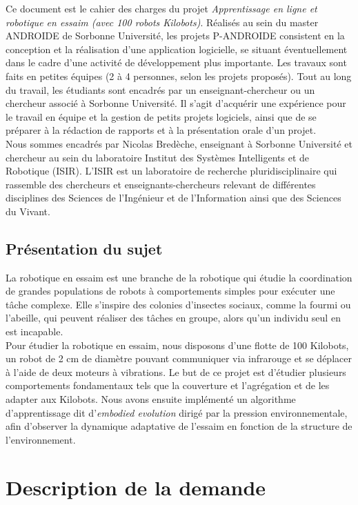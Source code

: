 \documentclass[a4paper]{article}
\begin{document}
Ce document est le cahier des charges du projet \textit{Apprentissage en ligne et robotique en essaim (avec 100 robots Kilobots)}.
Réalisés au sein du master ANDROIDE de Sorbonne Université, les projets P-ANDROIDE consistent en la conception et la réalisation d'une application logicielle, se situant éventuellement dans le cadre d'une activité de développement plus importante. Les travaux sont faits en petites équipes (2 à 4 personnes, selon les projets proposés). Tout au long du travail, les étudiants sont encadrés par un enseignant-chercheur ou un chercheur associé à Sorbonne Université. Il s’agit d'acquérir une expérience pour le travail en équipe et la gestion de petits projets logiciels, ainsi que de se préparer à la rédaction de rapports et à la présentation orale d'un projet. \\

Nous sommes encadrés par Nicolas Bredèche, enseignant à Sorbonne Université et chercheur au sein du laboratoire Institut des Systèmes Intelligents et de Robotique (ISIR). L'ISIR est un laboratoire de recherche pluridisciplinaire qui rassemble des chercheurs et enseignants-chercheurs relevant de différentes disciplines des Sciences de l’Ingénieur et de l’Information ainsi que des Sciences du Vivant.

\subsection{Présentation du sujet}

La robotique en essaim est une branche de la robotique qui étudie la coordination de grandes populations de robots à comportements simples pour exécuter une tâche complexe. Elle s'inspire des colonies d'insectes sociaux, comme la fourmi ou l'abeille, qui peuvent réaliser des tâches en groupe, alors qu'un individu seul en est incapable. \\ Pour étudier la robotique en essaim, nous disposons d'une flotte de 100 Kilobots, un robot de 2 cm de diamètre pouvant communiquer via infrarouge et se déplacer à l'aide de deux moteurs à vibrations. Le but de ce projet est d'étudier plusieurs comportements fondamentaux tels que la couverture et l'agrégation et de les adapter aux Kilobots. Nous avons ensuite implémenté un algorithme d'apprentissage dit d'\textit{embodied evolution} dirigé par la pression environnementale, afin d'observer la dynamique adaptative de l'essaim en fonction de la structure de l'environnement.


\section{Description de la demande}
\end{document}

